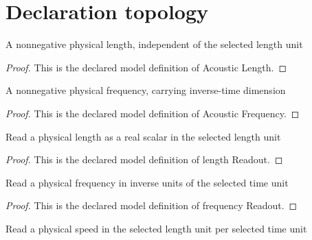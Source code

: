 \section{Declaration topology}
\begin{definition}
  \label{def:physics:phyx-mini-0183:phyxminiproblems-problemphyxmini0183-acousticlength}
  A nonnegative physical length, independent of the selected length unit
\end{definition}
\begin{proof}
  This is the declared model definition of Acoustic Length.
\end{proof}
\begin{definition}
  \label{def:physics:phyx-mini-0183:phyxminiproblems-problemphyxmini0183-acousticfrequency}
  A nonnegative physical frequency, carrying inverse-time dimension
\end{definition}
\begin{proof}
  This is the declared model definition of Acoustic Frequency.
\end{proof}
\begin{definition}
  \label{def:physics:phyx-mini-0183:phyxminiproblems-problemphyxmini0183-lengthreadout}
  Read a physical length as a real scalar in the selected length unit
\end{definition}
\begin{proof}
  This is the declared model definition of length Readout.
\end{proof}
\begin{definition}
  \label{def:physics:phyx-mini-0183:phyxminiproblems-problemphyxmini0183-frequencyreadout}
  Read a physical frequency in inverse units of the selected time unit
\end{definition}
\begin{proof}
  This is the declared model definition of frequency Readout.
\end{proof}
\begin{definition}
  \label{def:physics:phyx-mini-0183:phyxminiproblems-problemphyxmini0183-speedreadout}
  Read a physical speed in the selected length unit per selected time unit
\end{definition}
